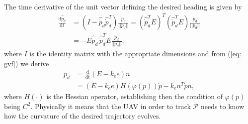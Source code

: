 \documentclass[letterpaper, 10 pt, conference]{ieeeconf}  %
\begin{document}
The time derivative of the unit vector defining the desired heading is given by
\begin{align}
	\frac{\mathrm{d}\hat{\dot p}_d}{\mathrm{dt}} &= (I - \hat{\dot p}_d \hat{\dot p}_d^T)\frac{\ddot p_d}{||\dot p_d||} = (\hat{\dot p}_d^TE)^T(\hat{\dot p}_d^TE)\frac{\ddot p_d}{||\dot p_d||} \nonumber \\
&= -E\hat{\dot p}_d \, \hat{\dot p}_d^T E \frac{\ddot p_d}{||\dot p_d||},
\label{eq: ph_d}
\end{align}
where $I$ is the identity matrix with the appropriate dimensions and from (\ref{eq: gvf}) we derive
\begin{align}
	\ddot p_d &= \frac{\mathrm{d}}{\mathrm{dt}}(E-k_ee)n \nonumber \\
	&= (E -k_ee)H(\varphi(p))\dot p - k_en^T\dot p n,
	\label{eq: pd_dd}
\end{align}
where $H(\cdot)$ is the Hessian operator, establishing then the condition of $\varphi(p)$ being $C^2$. Physically it means that the UAV in order to track $\mathcal{P}$ needs to know how the curvature of the desired trajectory evolves. 
\end{document}
